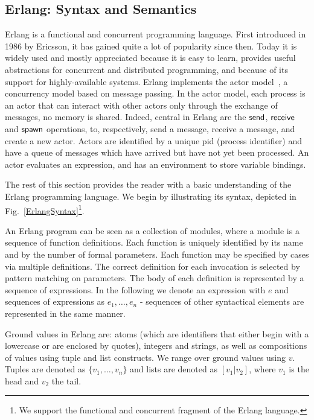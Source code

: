 \documentclass{article}[12pt,a4paper]
\theoremstyle{definition}
\begin{document}
\subsection{Erlang: Syntax and Semantics}

Erlang is a functional and concurrent programming language. First
introduced in 1986 by Ericsson, it has gained quite a lot of
popularity since then.  Today it is widely used and mostly appreciated
because it is easy to learn, provides useful abstractions for
concurrent and distributed programming, and because of its support for
highly-available systems. Erlang implements the actor model~\cite{Hewitt73}, a
concurrency model based on message passing. In the actor model, each
process is an actor that can interact with other actors
only through the exchange of messages, no memory is shared. Indeed,
central in Erlang are the $\mathsf{send}$, $\mathsf{receive}$ and $\mathsf{spawn}$
operations, to, respectively, send a message, receive a message, and
create a new actor. Actors are identified by a unique pid (process identifier) and have a queue of messages which have arrived but have not yet been processed.
An actor evaluates an expression, and has an environment to store variable bindings.

The rest of this section provides the reader with a basic understanding
of the Erlang programming language. We begin by illustrating its syntax, depicted in
Fig.~\ref{ErlangSyntax}\footnote{We support the functional and concurrent fragment of the
  Erlang language.}. 

An Erlang program can be seen as a collection of modules, where a module is a sequence of function definitions. Each function is uniquely identified by its name and by the
number of formal parameters. Each function may be specified by cases via multiple definitions. The correct definition for each invocation is selected by pattern matching on parameters. The body of each definition is represented
by a sequence of expressions. In the following we denote an expression with $e$
and sequences of expressions as $e_1,\ldots,e_n$  - sequences of other
syntactical elements are represented in the same manner.  

Ground values in Erlang are: atoms (which are identifiers that either
begin with a lowercase or are enclosed by quotes), integers and
strings, as well as compositions of values using tuple and list
constructs. We range over ground values using $v$. Tuples are denoted
as $\{v_1,\ldots,v_n\}$ and lists are denoted as
$[v_1|v_2]$, where $v_1$ is the head and $v_2$ the tail.
\end{document}
